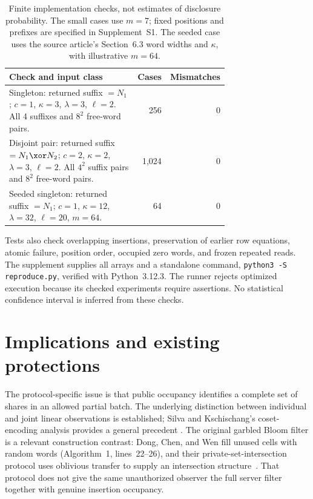 \begin{table}[ht]
\centering
\small
\begin{tabular}{@{}>{\raggedright\arraybackslash}p{0.72\linewidth}rr@{}}
\toprule
Check and input class & Cases & Mismatches\\
\midrule
Singleton: returned suffix $=N_1$; $c=1$, $\kappa=3$,
$\lambda=3$, $\ell=2$. All 4 suffixes and $8^2$ free-word pairs.
& 256 & 0\\[3pt]
Disjoint pair: returned suffix $=N_1\xor N_2$; $c=2$, $\kappa=2$,
$\lambda=3$, $\ell=2$. All $4^2$ suffix pairs and $8^2$ free-word pairs.
& 1,024 & 0\\[3pt]
Seeded singleton: returned suffix $=N_1$; $c=1$, $\kappa=12$,
$\lambda=32$, $\ell=20$, $m=64$.
& 64 & 0\\
\bottomrule
\end{tabular}
\caption{Finite implementation checks, not estimates of disclosure probability.
The small cases use $m=7$; fixed positions and prefixes are specified in
Supplement~S1. The seeded case uses the source article's Section~6.3 word widths
and $\kappa$, with illustrative $m=64$.}
\label{tab:checks}
\end{table}

Tests also check overlapping insertions, preservation of earlier row equations,
atomic failure, position order, occupied zero words, and frozen repeated reads.
The supplement supplies all arrays and a standalone command,
\texttt{python3 -S reproduce.py}, verified with Python~3.12.3. The runner
rejects optimized execution because its checked experiments require assertions.
No statistical confidence interval is inferred from these checks.

\section{Implications and existing protections}

The protocol-specific issue is that public occupancy identifies a complete
set of shares in an allowed partial batch. The underlying distinction between
individual and joint linear observations is established; Silva and
Kschischang's coset-encoding analysis provides a general precedent
\cite{silva2011universal}. The original garbled Bloom filter is a relevant
construction contrast: Dong, Chen, and Wen fill unused cells with random words
(Algorithm~1, lines~22--26), and their private-set-intersection protocol uses
oblivious transfer to supply an intersection structure~\cite{dong2013gbf}.
That protocol does not give the same unauthorized observer the full server
filter together with genuine insertion occupancy.

